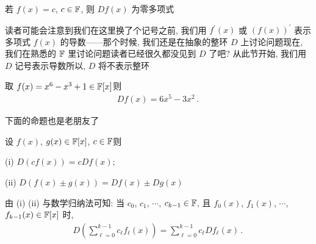 \begin{remark}
    若 $f(x) = c$, $c \in \mathbb{F}$, 则 $Df(x)$ 为零多项式\period
\end{remark}

\begin{remark}
    读者可能会注意到我们在这里换了个记号\period 之前, 我们用 $f^{\prime} (x)$ 或 $(f(x))^{\prime}$ 表示多项式 $f(x)$ 的导数——那个时候, 我们还是在抽象的整环 $D$ 上讨论问题\period 现在, 我们在熟悉的 $\mathbb{F}$ 里讨论问题\period 读者已经很久都没见到 $D$ 了吧? 从此节开始, 我们用 $D$ 记号表示导数\period 所以, $D$ 将不表示整环\period
\end{remark}

\begin{example}
    取 $f(x) = x^6 - x^3 + 1 \in \mathbb{F}[x]$\period 则
    \begin{align*}
        Df(x) = 6x^5 - 3x^2 \period
    \end{align*}
\end{example}

下面的命题也是老朋友了\period

\begin{proposition}
    设 $f(x)$, $g(x) \in \mathbb{F}[x]$, $c \in \mathbb{F}$\period 则

    (i) $D(cf(x)) = c Df(x)$;

    (ii) $D(f(x) \pm g(x)) = Df(x) \pm Dg(x)$\period

    由 (i) (ii) 与数学归纳法可知: 当 $c_0$, $c_1$, $\cdots$, $c_{k-1} \in \mathbb{F}$, 且 $f_0 (x)$, $f_1 (x)$, $\cdots$, $f_{k-1} (x) \in \mathbb{F}[x]$ 时,
    \begin{align*}
        D \left( \sum_{\ell = 0}^{k-1} c_\ell f_\ell (x) \right) = \sum_{\ell = 0}^{k-1} c_\ell Df_\ell (x) \period
    \end{align*}
\end{proposition}

